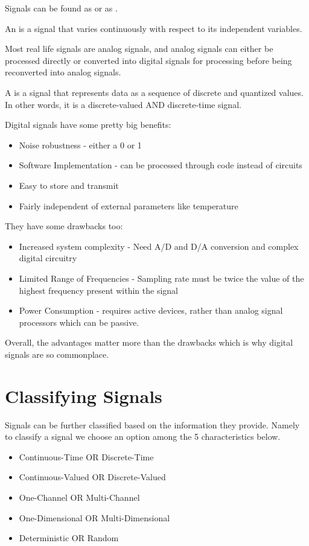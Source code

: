 Signals can be found as  or as .
\begin{definition}
	An  is a signal that varies continuously with respect to its independent variables.
\end{definition}

Most real life signals are analog signals, and analog signals can either be processed directly or converted into digital signals for processing before being reconverted into analog signals.

\begin{definition}
	A  is a signal that represents data as a sequence of discrete and quantized values. In other words, it is a discrete-valued AND discrete-time signal.
\end{definition}

Digital signals have some pretty big benefits:
\begin{itemize}
	\item Noise robustness - either a 0 or 1
	\item Software Implementation - can be processed through code instead of circuits
	\item Easy to store and transmit
	\item Fairly independent of external parameters like temperature
\end{itemize}

They have some drawbacks too:
\begin{itemize}
	\item Increased system complexity - Need A/D and D/A conversion and complex digital circuitry
	\item Limited Range of Frequencies - Sampling rate must be twice the value of the highest frequency present within the signal
	\item Power Consumption - requires active devices, rather than analog signal processors which can be passive.
\end{itemize}

Overall, the advantages matter more than the drawbacks which is why digital signals are so commonplace.

\section{Classifying Signals}

Signals can be further classified based on the information they provide. Namely to classify a signal we choose an option among the 5 characteristics below.
\begin{itemize}
	\item Continuous-Time OR Discrete-Time
	\item Continuous-Valued OR Discrete-Valued
	\item One-Channel OR Multi-Channel
	\item One-Dimensional OR Multi-Dimensional
	\item Deterministic OR Random
\end{itemize}

